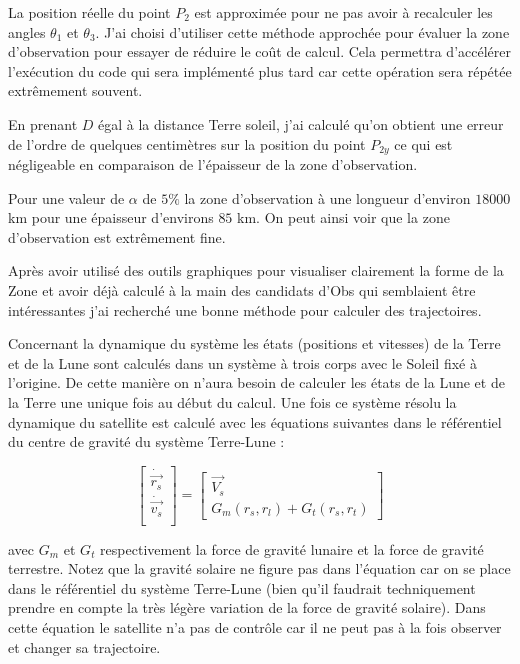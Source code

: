 \documentclass[11pt]{article} %
\begin{document}
		La position réelle du point $P_2$ est approximée pour ne pas avoir à recalculer les angles $\theta_1$ et $\theta_3$. J'ai choisi d'utiliser cette méthode approchée pour évaluer la zone d'observation pour essayer de réduire le coût de calcul. Cela permettra d'accélérer l'exécution du code qui sera implémenté plus tard car cette opération sera répétée extrêmement souvent.
		
		En prenant $D$ égal à la distance Terre soleil, j'ai calculé qu'on obtient une erreur de l'ordre de quelques centimètres sur la position du point $P_{2y}$ ce qui est négligeable en comparaison de l'épaisseur de la zone d'observation.
		
		Pour une valeur de $\alpha$ de $5\%$ la zone d'observation à une longueur d'environ $18000$ km pour une épaisseur d'environs $85$ km. On peut ainsi voir que la zone d'observation est extrêmement fine.
		
		Après avoir utilisé des outils graphiques pour visualiser clairement la forme de la \gls{Zone} et avoir déjà calculé à la main des candidats d'\gls{Obs} qui semblaient être intéressantes j'ai recherché une bonne méthode pour calculer des trajectoires.
		
		Concernant la dynamique du système les états (positions et vitesses) de la Terre et de la Lune sont calculés dans un système à trois corps avec le Soleil fixé à l'origine. De cette manière on n'aura besoin de calculer les états de la Lune et de la Terre une unique fois au début du calcul. Une fois ce système résolu la dynamique du satellite est calculé avec les équations suivantes dans le référentiel du centre de gravité du système Terre-Lune :
		
		$$
		\begin{bmatrix}
			\dot{\overrightarrow{r_{s}}}\\
			\dot{\overrightarrow{v_{s}}}\\
		\end{bmatrix} =\begin{bmatrix}
			\overrightarrow{V_{s}}\\
			G_{m}(r_s,r_l)+G_{t}(r_s,r_t)
		\end{bmatrix}
		$$
		
		avec $G_m$ et $G_t$ respectivement la force de gravité lunaire et la force de gravité terrestre. Notez que la gravité solaire ne figure pas dans l'équation car on se place dans le référentiel du système Terre-Lune (bien qu'il faudrait techniquement prendre en compte la très légère variation de la force de gravité solaire). Dans cette équation le satellite n'a pas de contrôle car il ne peut pas à la fois observer et changer sa trajectoire.
		
\end{document}
